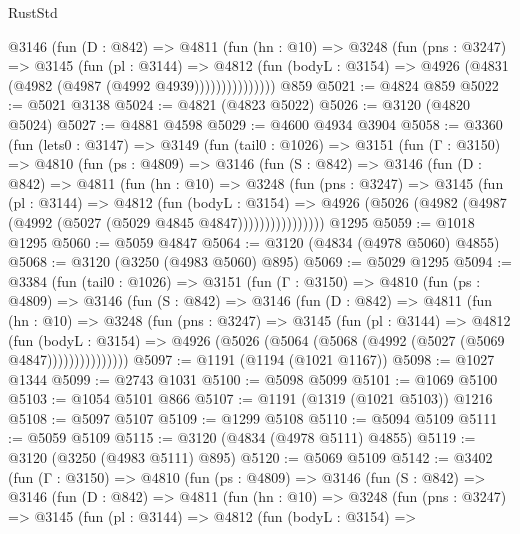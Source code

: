 \begin{lexlean}{RustStd}
\begin{coremodule}
{\begin{coremodule}
{{{{{{{{{{{{{{{{{{{{{{{{{{              @3146
                (fun (D : @842) =>
                @4811
                  (fun (hn : @10) =>
                  @3248
                    (fun (pns : @3247) =>
                    @3145
                      (fun (pl : @3144) =>
                      @4812
                        (fun (bodyL : @3154) =>
                        @4926 (@4831 (@4982 (@4987 (@4992 @4939)))))))))))))))
    @859
@5021 := @4824 @859
@5022 := @5021 @3138
@5024 := @4821 (@4823 @5022)
@5026 := @3120 (@4820 @5024)
@5027 := @4881 @4598
@5029 := @4600 @4934 @3904
@5058 := @3360
    (fun (lets0 : @3147) =>
    @3149
      (fun (tail0 : @1026) =>
      @3151
        (fun (Γ : @3150) =>
        @4810
          (fun (ps : @4809) =>
          @3146
            (fun (S : @842) =>
            @3146
              (fun (D : @842) =>
              @4811
                (fun (hn : @10) =>
                @3248
                  (fun (pns : @3247) =>
                  @3145
                    (fun (pl : @3144) =>
                    @4812
                      (fun (bodyL : @3154) =>
                      @4926 (@5026 (@4982 (@4987 (@4992 (@5027 (@5029 @4845 @4847))))))))))))))))
    @1295
@5059 := @1018 @1295
@5060 := @5059 @4847
@5064 := @3120 (@4834 (@4978 @5060) @4855)
@5068 := @3120 (@3250 (@4983 @5060) @895)
@5069 := @5029 @1295
@5094 := @3384
    (fun (tail0 : @1026) =>
    @3151
      (fun (Γ : @3150) =>
      @4810
        (fun (ps : @4809) =>
        @3146
          (fun (S : @842) =>
          @3146
            (fun (D : @842) =>
            @4811
              (fun (hn : @10) =>
              @3248
                (fun (pns : @3247) =>
                @3145
                  (fun (pl : @3144) =>
                  @4812
                    (fun (bodyL : @3154) =>
                    @4926 (@5026 (@5064 (@5068 (@4992 (@5027 (@5069 @4847)))))))))))))))
@5097 := @1191 (@1194 (@1021 @1167))
@5098 := @1027 @1344
@5099 := @2743 @1031
@5100 := @5098 @5099
@5101 := @1069 @5100
@5103 := @1054 @5101 @866
@5107 := @1191 (@1319 (@1021 @5103)) @1216
@5108 := @5097 @5107
@5109 := @1299 @5108
@5110 := @5094 @5109
@5111 := @5059 @5109
@5115 := @3120 (@4834 (@4978 @5111) @4855)
@5119 := @3120 (@3250 (@4983 @5111) @895)
@5120 := @5069 @5109
@5142 := @3402
    (fun (Γ : @3150) =>
    @4810
      (fun (ps : @4809) =>
      @3146
        (fun (S : @842) =>
        @3146
          (fun (D : @842) =>
          @4811
            (fun (hn : @10) =>
            @3248
              (fun (pns : @3247) =>
              @3145
                (fun (pl : @3144) =>
                @4812
                  (fun (bodyL : @3154) =>
}}}}}}}}}}}}}}}}}}}}}}}}}}
\end{coremodule}}
\end{coremodule}
\end{lexlean}
